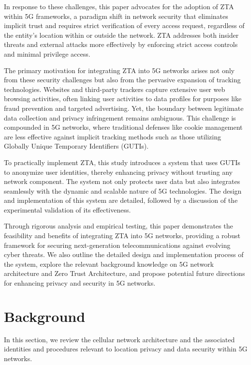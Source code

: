\documentclass[sigplan,screen]{acmart}
\begin{document}
In response to these challenges, this paper advocates for the adoption of ZTA within 5G frameworks, a paradigm shift in network security that eliminates implicit trust and requires strict verification of every access request, regardless of the entity's location within or outside the network. ZTA addresses both insider threats and external attacks more effectively by enforcing strict access controls and minimal privilege access.

The primary motivation for integrating ZTA into 5G networks arises not only from these security challenges but also from the pervasive expansion of tracking technologies. Websites and third-party trackers capture extensive user web browsing activities, often linking user activities to data profiles for purposes like fraud prevention and targeted advertising. Yet, the boundary between legitimate data collection and privacy infringement remains ambiguous. This challenge is compounded in 5G networks, where traditional defenses like cookie management are less effective against implicit tracking methods such as those utilizing Globally Unique Temporary Identifiers (GUTIs).

To practically implement ZTA, this study introduces a system that uses GUTIs to anonymize user identities, thereby enhancing privacy without trusting any network component. The system not only protects user data but also integrates seamlessly with the dynamic and scalable nature of 5G technologies. The design and implementation of this system are detailed, followed by a discussion of the experimental validation of its effectiveness.

Through rigorous analysis and empirical testing, this paper demonstrates the feasibility and benefits of integrating ZTA into 5G networks, providing a robust framework for securing next-generation telecommunications against evolving cyber threats. We also outline the detailed design and implementation process of the system, explore the relevant background knowledge on 5G network architecture and Zero Trust Architecture, and propose potential future directions for enhancing privacy and security in 5G networks.


\section{Background}
In this section, we review the cellular network architecture and the associated identities and procedures relevant to location privacy and data security within 5G networks.
\end{document}
